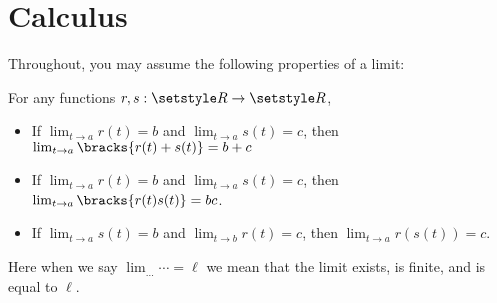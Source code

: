 \section{Calculus}

Throughout, you may assume the following properties of a limit:

\begin{tcolorbox}
 For any functions \(r, s : \Reals \to \Reals\),
 \begin{itemize}
  \item
   If \(\lim_{t \to a} r(t) = b\) and \(\lim_{t \to a} s(t) = c\), then
   \(\lim_{t \to a} \bracks{r(t) + s(t)} = b + c\)
  \item
   If \(\lim_{t \to a} r(t) = b\) and \(\lim_{t \to a} s(t) = c\), then
   \(\lim_{t \to a} \bracks{r(t) s(t)} = bc\).
  \item
   If \(\lim_{t \to a} s(t) = b\) and \(\lim_{t \to b} r(t) = c\), then
   \(\lim_{t \to a} r(s(t)) = c\).
 \end{itemize}
 Here when we say \(\lim_{\ldots} \dotsb = \ell\) we mean that
 the limit exists, is finite, and is equal to \(\ell\).
\end{tcolorbox}

